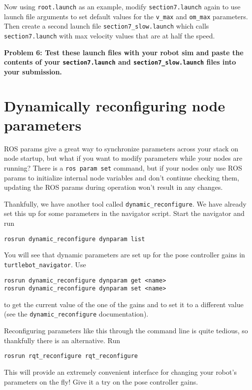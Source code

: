 \documentclass{article}
\begin{document}
Now using \texttt{root.launch} as an example, modify \texttt{section7.launch} again to use launch file arguments to set default values for the \texttt{v\_max} and \texttt{om\_max} parameters. Then create a second launch file \texttt{section7\_slow.launch} which calls \texttt{section7.launch} with max velocity values that are at half the speed.

{\bf Problem 6: Test these launch files with your robot sim and paste the contents of your \texttt{section7.launch} and \texttt{section7\_slow.launch} files into your submission.}

\section{Dynamically reconfiguring node parameters}
ROS params give a great way to synchronize parameters across your stack on node startup, but what if you want to modify parameters while your nodes are running? There is a \texttt{ros param set} command, but if your nodes only use ROS params to initialize internal node variables and don't continue checking them, updating the ROS params during operation won't result in any changes.

Thankfully, we have another tool called \texttt{dynamic\_reconfigure}. We have already set this up for some parameters in the navigator script. Start the navigator and run
\begin{lstlisting}
rosrun dynamic_reconfigure dynparam list
\end{lstlisting}

You will see that dynamic parameters are set up for the pose controller gains in \texttt{turtlebot\_navigator}. Use 
\begin{lstlisting}
rosrun dynamic_reconfigure dynparam get <name>
rosrun dynamic_reconfigure dynparam set <name>
\end{lstlisting}

to get the current value of the one of the gains and to set it to a different value (see the \texttt{dynamic\_reconfigure} documentation).

Reconfiguring parameters like this through the command line is quite tedious, so thankfully there is an alternative. Run
\begin{lstlisting}
rosrun rqt_reconfigure rqt_reconfigure
\end{lstlisting}

This will provide an extremely convenient interface for changing your robot's parameters on the fly! Give it a try on the pose controller gains.
\end{document}

